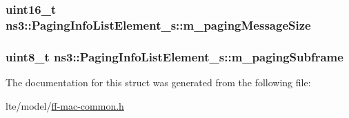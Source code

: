 \subsubsection[{\texorpdfstring{m\+\_\+paging\+Message\+Size}{m_pagingMessageSize}}]{\setlength{\rightskip}{0pt plus 5cm}uint16\+\_\+t ns3\+::\+Paging\+Info\+List\+Element\+\_\+s\+::m\+\_\+paging\+Message\+Size}\hypertarget{structns3_1_1PagingInfoListElement__s_ae8aaabcb55b9ea2cc35ac41f9aa92e5b}{}\label{structns3_1_1PagingInfoListElement__s_ae8aaabcb55b9ea2cc35ac41f9aa92e5b}
\subsubsection[{\texorpdfstring{m\+\_\+paging\+Subframe}{m_pagingSubframe}}]{\setlength{\rightskip}{0pt plus 5cm}uint8\+\_\+t ns3\+::\+Paging\+Info\+List\+Element\+\_\+s\+::m\+\_\+paging\+Subframe}\hypertarget{structns3_1_1PagingInfoListElement__s_a13b3ba2e2cb0413364b50a4d49965a10}{}\label{structns3_1_1PagingInfoListElement__s_a13b3ba2e2cb0413364b50a4d49965a10}


The documentation for this struct was generated from the following file\+:\begin{DoxyCompactItemize}
\item 
lte/model/\hyperlink{ff-mac-common_8h}{ff-\/mac-\/common.\+h}\end{DoxyCompactItemize}
